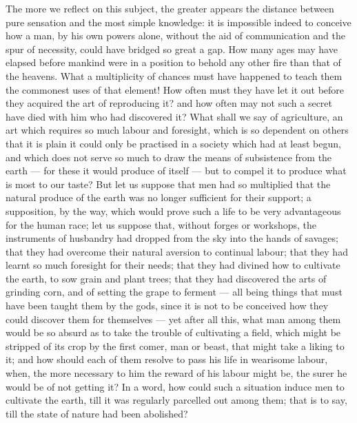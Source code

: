 \documentclass[12pt]{report}
\begin{document}
The more we reflect on this subject, the greater appears the distance between pure sensation and the most simple knowledge: it is impossible indeed to conceive how a man, by his own powers alone, without the aid of communication and the spur of necessity, could have bridged so great a gap. How many ages may have elapsed before mankind were in a position to behold any other fire than that of the heavens. What a multiplicity of chances must have happened to teach them the commonest uses of that element! How often must they have let it out before they acquired the art of reproducing it? and how often may not such a secret have died with him who had discovered it? What shall we say of agriculture, an art which requires so much labour and foresight, which is so dependent on others that it is plain it could only be practised in a society which had at least begun, and which does not serve so much to draw the means of subsistence from the earth — for these it would produce of itself — but to compel it to produce what is most to our taste? But let us suppose that men had so multiplied that the natural produce of the earth was no longer sufficient for their support; a supposition, by the way, which would prove such a life to be very advantageous for the human race; let us suppose that, without forges or workshops, the instruments of husbandry had dropped from the sky into the hands of savages; that they had overcome their natural aversion to continual labour; that they had learnt so much foresight for their needs; that they had divined how to cultivate the earth, to sow grain and plant trees; that they had discovered the arts of grinding corn, and of setting the grape to ferment — all being things that must have been taught them by the gods, since it is not to be conceived how they could discover them for themselves — yet after all this, what man among them would be so absurd as to take the trouble of cultivating a field, which might be stripped of its crop by the first comer, man or beast, that might take a liking to it; and how should each of them resolve to pass his life in wearisome labour, when, the more necessary to him the reward of his labour might be, the surer he would be of not getting it? In a word, how could such a situation induce men to cultivate the earth, till it was regularly parcelled out among them; that is to say, till the state of nature had been abolished?
\end{document}
